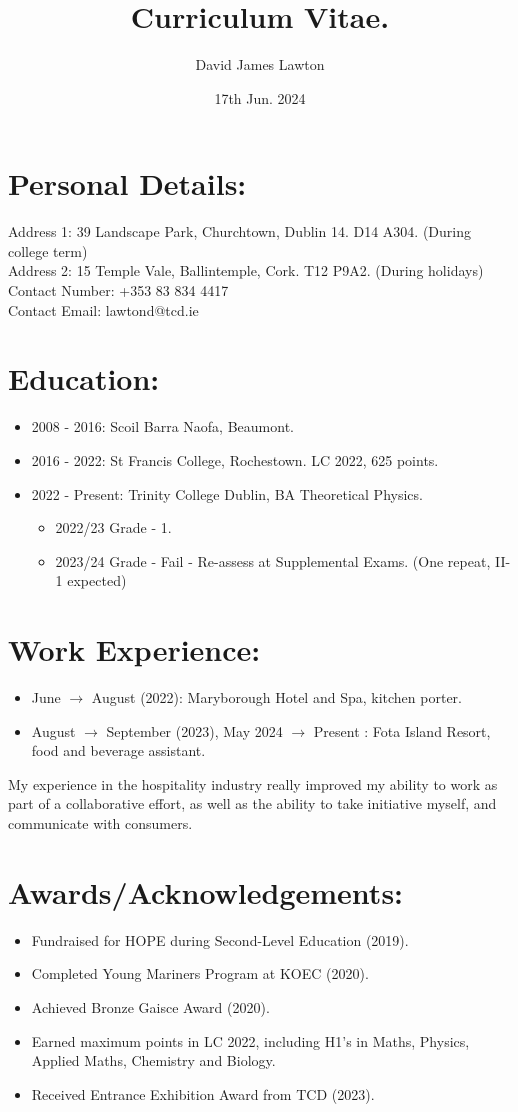 \documentclass{article}
\title{Curriculum Vitae.}
\author{David James Lawton}
\date{17th Jun. 2024}
\begin{document}
\maketitle

\section{Personal Details:}
Address 1: 39 Landscape Park, Churchtown, Dublin 14. D14 A304. (During college term)\\
Address 2: 15 Temple Vale, Ballintemple, Cork. T12 P9A2. (During holidays)
Contact Number: +353 83 834 4417\\
Contact Email: lawtond@tcd.ie\\

\section{Education:}
\begin{itemize}
\item 2008 - 2016: Scoil Barra Naofa, Beaumont.
\item 2016 - 2022: St Francis College, Rochestown. LC 2022, 625 points.
\item 2022 - Present: Trinity College Dublin, BA Theoretical Physics. 
\begin{itemize}
\item 2022/23 Grade - 1.
\item 2023/24 Grade - Fail - Re-assess at Supplemental Exams. (One repeat, II-1 expected)
\end{itemize}
\end{itemize}
\section{Work Experience:}
\begin{itemize}
\item June $\rightarrow$ August (2022): Maryborough Hotel and Spa, kitchen porter. 
\item August $\rightarrow$  September (2023), May 2024 $\rightarrow$ Present : Fota Island Resort, food and beverage assistant.
\end{itemize}
My experience in the hospitality industry really improved my ability to work as part of a collaborative effort, as well as the ability to take initiative myself, and communicate with consumers.
\section{Awards/Acknowledgements:}
\begin{itemize}
\item Fundraised for HOPE during Second-Level Education (2019).
\item Completed Young Mariners Program at KOEC (2020).
\item Achieved Bronze Gaisce Award (2020).
\item Earned maximum points in LC 2022, including H1's in Maths, Physics, Applied Maths, Chemistry and Biology.
\item Received Entrance Exhibition Award from TCD (2023).
\end{itemize}
\end{document}
